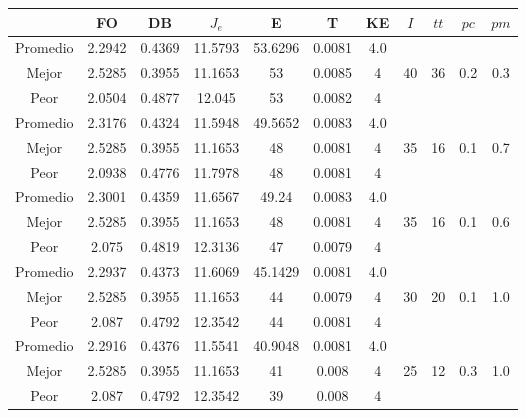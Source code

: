 \begin{table}[h!]
    \footnotesize
    \begin{center}
        \begin{tabular}{|c|c|c|c|c|c|c|c|c|c|c|}
        \hline
             & {\bf FO} & {\bf DB} & $J_e$ & {\bf E} & {\bf T} & {\bf KE} & $I$ & $tt$ & $pc$ & $pm$ \\
        \hline
        \hline
            Promedio  & 2.2942 & 0.4369 & 11.5793 & 53.6296 & 0.0081 & 4.0 &  &  &  & \\
            \cline{1-7}
            Mejor & 2.5285 & 0.3955  & 11.1653 & 53 & 0.0085 & 4 & 40 & 36 & 0.2 & 0.3\\
            \cline{1-7}
            Peor & 2.0504 & 0.4877  & 12.045 & 53 & 0.0082 & 4 &  &  &  & \\
        \hline
        \hline
            Promedio  & 2.3176 & 0.4324 & 11.5948 & 49.5652 & 0.0083 & 4.0 &  &  &  & \\
            \cline{1-7}
            Mejor & 2.5285 & 0.3955  & 11.1653 & 48 & 0.0081 & 4 & 35 & 16 & 0.1 & 0.7\\
            \cline{1-7}
            Peor & 2.0938 & 0.4776  & 11.7978 & 48 & 0.0081 & 4 &  &  &  & \\
        \hline
        \hline
            Promedio  & 2.3001 & 0.4359 & 11.6567 & 49.24 & 0.0083 & 4.0 &  &  &  & \\
            \cline{1-7}
            Mejor & 2.5285 & 0.3955  & 11.1653 & 48 & 0.0081 & 4 & 35 & 16 & 0.1 & 0.6\\
            \cline{1-7}
            Peor & 2.075 & 0.4819  & 12.3136 & 47 & 0.0079 & 4 &  &  &  & \\
        \hline
        \hline
            Promedio  & 2.2937 & 0.4373 & 11.6069 & 45.1429 & 0.0081 & 4.0 &  &  &  & \\
            \cline{1-7}
            Mejor & 2.5285 & 0.3955  & 11.1653 & 44 & 0.0079 & 4 & 30 & 20 & 0.1 & 1.0\\
            \cline{1-7}
            Peor & 2.087 & 0.4792  & 12.3542 & 44 & 0.0081 & 4 &  &  &  & \\
        \hline
        \hline
            Promedio  & 2.2916 & 0.4376 & 11.5541 & 40.9048 & 0.0081 & 4.0 &  &  &  & \\
            \cline{1-7}
            Mejor & 2.5285 & 0.3955  & 11.1653 & 41 & 0.008 & 4 & 25 & 12 & 0.3 & 1.0\\
            \cline{1-7}
            Peor & 2.087 & 0.4792  & 12.3542 & 39 & 0.008 & 4 &  &  &  & \\

\end{tabular}
\end{center}
\end{table}
